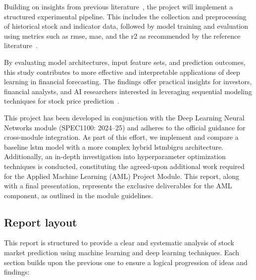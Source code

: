 Building on insights from previous literature~\parencite{parmar2018stock, nabipour2020DeepLearning}, 
the project will implement a structured experimental pipeline. This includes the collection and 
preprocessing of historical stock and indicator data, followed by model training and evaluation using
metrics such as \acrfull{rmse}, \acrfull{mae}, and the \acrfull{r2} as recommended by the reference 
literature~\parencite{chang2024StockPrediction, phuoc2024StockPrediction}.

By evaluating model architectures, input feature sets, and prediction outcomes, this study contributes
to more effective and interpretable applications of deep learning in financial forecasting. The 
findings offer practical insights for investors, financial analysts, and AI researchers interested in 
leveraging sequential modeling techniques for stock price 
prediction~\parencite{balasubramanian2023SystematicSurvey, shaban2024SMPDL, guo2024LSTMStock, 
agrawal2022StockPrediction}.

This project has been developed in conjunction with the Deep Learning Neural Networks 
module (SPEC1100: 2024--25) and adheres to the official guidance for cross-module 
integration. As part of this effort, we implement and compare a baseline 
\acrshort{lstm} model with a more complex hybrid \acrshort{lstmbigru} architecture. 
Additionally, an in-depth investigation into hyperparameter optimization techniques is 
conducted, constituting the agreed-upon additional work required for the Applied 
Machine Learning (AML) Project Module. This report, along with a final presentation, 
represents the exclusive deliverables for the AML component, as outlined in the module
guidelines.

\subsection{Report layout}

This report is structured to provide a clear and systematic analysis of stock 
market prediction using machine learning and deep learning techniques. Each 
section builds upon the previous one to ensure a logical progression of ideas 
and findings:

